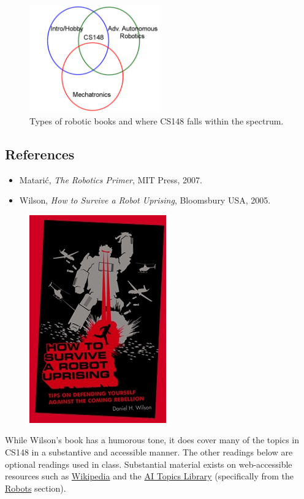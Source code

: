 \begin{figure}[!h]
\centering
\includegraphics[width=0.5\textwidth]{figures/1_venn.png}
\caption{Types of robotic books and where CS148 falls within the spectrum.}
\label{fig:1_venn}
\end{figure}

\subsection{References}

\begin{itemize}
 
\item Matari\'c, \emph{The Robotics Primer}, MIT Press, 2007.
\item Wilson, \emph{How to Survive a Robot Uprising}, Bloomsbury USA, 2005.
\end{itemize}

\begin{figure}
\includegraphics[height=0.25\columnwidth]{figures/1_robot_uprising.jpg}
\end{figure}

While Wilson's book has a humorous tone, it does cover many of the topics in CS148 in a substantive and accessible manner.  The other readings below are optional readings used in class.  Substantial material exists on web-accessible resources such as \href{http://wikipedia.org/}{Wikipedia} and the \href{http://www.aaai.org/aitopics/}{AI Topics Library} (specifically from the \href{http://www.aaai.org/aitopics/html/robots.html}{Robots} section).

